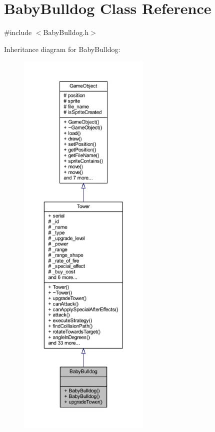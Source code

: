 \hypertarget{class_baby_bulldog}{\section{Baby\+Bulldog Class Reference}
\label{class_baby_bulldog}
}


{\ttfamily \#include $<$Baby\+Bulldog.\+h$>$}



Inheritance diagram for Baby\+Bulldog\+:
\nopagebreak
\begin{figure}[H]
\begin{center}
\leavevmode
\includegraphics[height=550pt]{class_baby_bulldog__inherit__graph}
\end{center}
\end{figure}


